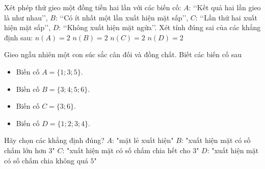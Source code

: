 

\begin{ex}%
	Xét phép thử gieo một đồng tiền hai  lần với các biến cố: $A$: \lq\lq Kết quả hai lần gieo là như nhau\rq\rq, $B$: \lq\lq Có ít nhất một lần xuất hiện mặt sấp\rq\rq, $C$: \lq\lq Lần thứ hai xuất hiện mặt sấp\rq\rq, $D$: \lq\lq Không xuất hiện mặt ngửa\rq\rq. Xét tính đúng sai của các khẳng định sau:
	 \choiceTF
		 {\True $n(A)=2$}
		 {$n(B)=2$}
		 {\True $n(C)=2$}
		 {$n(D)=2$}
\end{ex}

\begin{ex}%
	Gieo ngẫu nhiên một  con súc sắc cân đối và đồng chất. Biết các biến cố sau
	\begin{itemize}
		\item Biến cố $A=\{1;3;5\}$. 
		\item  Biến cố $B=\{3;4;5;6\}$.
		\item Biến cố $C=\{3;6\}$. 
		\item Biến  cố $D=\{1;2;3;4\}$.
	\end{itemize}
	Hãy chọn  các khẳng định đúng?
	\choiceTF 
		 {\True $A$: "mặt lẻ xuất hiện"}
		{$B$: "xuất hiện mặt  có số chấm lớn hơn $3$"}
		{\True $C$: "xuất hiện mặt có số chấm chia hết cho  $3$"}
		{$D$: "xuất hiện  mặt có số chấm chia không quá $5$"}
\end{ex}

